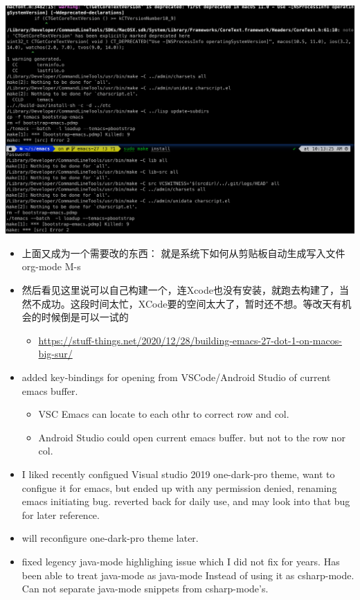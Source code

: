 \documentclass[9pt, b5paper]{article}
\begin{document}
\includegraphics[width=.9\linewidth]{./pic/readme_20230208_102317.png}
\begin{itemize}
\item 上面又成为一个需要改的东西： 就是系统下如何从剪贴板自动生成写入文件 org-mode M-s
\item 然后看见这里说可以自己构建一个，连Xcode也没有安装，就跑去构建了，当然不成功。这段时间太忙，XCode要的空间太大了，暂时还不想。等改天有机会的时候倒是可以一试的
\begin{itemize}
\item \url{https://stuff-things.net/2020/12/28/building-emacs-27-dot-1-on-macos-big-sur/}
\end{itemize}
\item added key-bindings for opening from VSCode/Android Studio of current emacs buffer. 
\begin{itemize}
\item VSC Emacs can locate to each othr to correct row and col.
\item Android Studio could open current emacs buffer. but not to the row nor col.
\end{itemize}
\item I liked recently configued Visual studio 2019 one-dark-pro theme, want to configue it for emacs, but ended up with any permission denied, renaming emacs initiating bug. reverted back for daily use, and may look into that bug for later reference.
\item will reconfigure one-dark-pro theme later.
\item fixed legency java-mode highlighing issue which I did not fix for years. Has been able to treat java-mode as java-mode Instead of using it as csharp-mode. Can not separate java-mode snippets from csharp-mode's.
\end{itemize}
\end{document}

